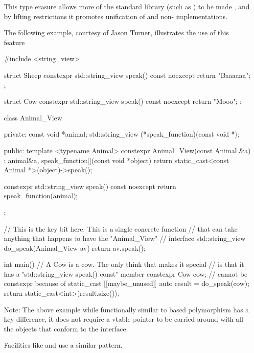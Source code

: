 \documentclass{wg21}
\begin{document}
    This type erasure allows more of the standard library (such as ) to be made , and by lifting restrictions it promotes unification of  and non- implementations.

    \pagebreak

    The following example, courtesy of Jason Turner, illustrates the use of this feature

    \begin{colorblock}
        #include <string_view>

        struct Sheep {
            constexpr std::string_view speak() const noexcept { return "Baaaaaa"; }
        };

        struct Cow {
            constexpr std::string_view speak() const noexcept { return "Mooo"; }
        };

        class Animal_View {
            private:
            const void *animal;
            std::string_view (*speak_function)(const void *);

            public:
            template <typename Animal>
            constexpr Animal_View(const Animal &a)
            : animal{&a}, speak_function{[](const void *object) {
                    return static_cast<const Animal *>(object)->speak();
            }} {}

            constexpr std::string_view speak() const noexcept {
                return speak_function(animal);
            }
        };

        // This is the key bit here. This is a single concrete function
        // that can take anything that happens to have the "Animal_View"
        // interface
        std::string_view do_speak(Animal_View av) { return av.speak(); }

        int main() {
            // A Cow is a cow. The only think that makes it special
            // is that it has a "std::string_view speak() const" member
            constexpr Cow cow;
            // cannot be constexpr because of static_cast
            [[maybe_unused]] auto result = do_speak(cow);
            return static_cast<int>(result.size());
        }
    \end{colorblock}

    Note: The above example while functionally similar to  based polymorphism has a key difference, it does not require a vtable pointer to be carried around with all the objects that conform to the interface.

    Facilities like  and  use a similar pattern.
\end{document}

